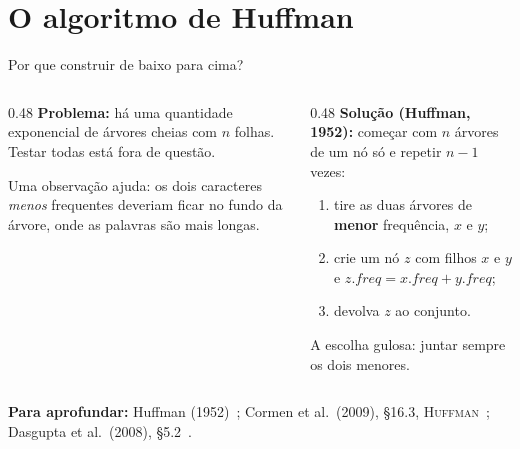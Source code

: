 \documentclass[aspectratio=169,xcolor=table]{beamer}
\newcommand{\fonte}[1]{%
  \vfill
  {\tiny\color{gray!55!black}\textbf{Para aprofundar:} #1\par}%
}
\begin{document}
\section{O algoritmo de Huffman}

\begin{frame}{Por que construir de baixo para cima?}
  \begin{columns}[T]
    \begin{column}{0.48\textwidth}
      \textbf{Problema:} há uma quantidade exponencial de árvores cheias com $n$ folhas.
      Testar todas está fora de questão.
      \medskip

      {\small Uma observação ajuda: os dois caracteres \emph{menos} frequentes deveriam ficar
      no fundo da árvore, onde as palavras são mais longas.}
    \end{column}
    \begin{column}{0.48\textwidth}
      \textbf{Solução (Huffman, 1952):} começar com $n$ árvores de um nó só e repetir $n-1$
      vezes:
      \begin{enumerate}
        \item tire as duas árvores de \textbf{menor} frequência, $x$ e $y$;
        \item crie um nó $z$ com filhos $x$ e $y$ e
              $z.\mathit{freq} = x.\mathit{freq} + y.\mathit{freq}$;
        \item devolva $z$ ao conjunto.
      \end{enumerate}
      {\small A escolha gulosa: juntar sempre os dois menores.}
    \end{column}
  \end{columns}
  \fonte{Huffman (1952)~\cite{huffman1952method}; Cormen et al.\ (2009), \S 16.3,
    \textsc{Huffman}~\cite{cormen2009introduction}; Dasgupta et al.\ (2008),
    \S 5.2~\cite{dasgupta2008algorithms}.}
\end{frame}
\end{document}
